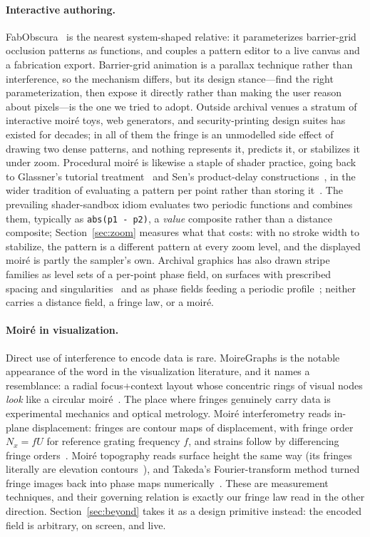 \paragraph{Interactive authoring.}
FabObscura~\cite{Sethapakdi2025FabObscura} is the nearest system-shaped relative:
it parameterizes barrier-grid occlusion patterns as functions, and couples a
pattern editor to a live canvas and a fabrication export. Barrier-grid animation
is a parallax technique rather than interference, so the mechanism differs, but its
design stance---find the right parameterization, then expose it directly rather
than making the user reason about pixels---is the one we tried to adopt. Outside
archival venues a stratum of interactive moir\'e toys, web generators, and
security-printing design suites has existed for decades; in all of them the
fringe is an unmodelled side effect of drawing two dense patterns, and nothing
represents it, predicts it, or stabilizes it under zoom. Procedural moir\'e is
likewise a staple of shader practice, going back to Glassner's tutorial
treatment~\cite{Glassner1997Inside} and Sen's product-delay
constructions~\cite{Sen1998Product, Sen2000Moire}, in the wider tradition of
evaluating a pattern per point rather than storing it~\cite{Ebert2003Texturing}.
The prevailing shader-sandbox idiom evaluates two periodic functions and
combines them, typically as \texttt{abs(p1 - p2)}, a \emph{value} composite
rather than a distance composite; Section~\ref{sec:zoom} measures what
that costs: with no stroke width to stabilize, the pattern is a different
pattern at every zoom level, and the displayed moir\'e is partly the
sampler's own. Archival graphics has also drawn stripe families as level sets
of a per-point phase field, on surfaces with prescribed spacing and
singularities~\cite{Knoppel2015Stripe} and as phase fields feeding a periodic
profile~\cite{Tricard2019Phasor}; neither carries a distance field, a fringe
law, or a moir\'e.

\paragraph{Moir\'e in visualization.}
Direct use of interference to encode data is rare. MoireGraphs is the notable
appearance of the word in the visualization literature, and it names a
resemblance: a radial focus+context layout whose concentric rings of visual nodes
\emph{look} like a circular moir\'e~\cite{JankunKelly2003Moire}. The place where
fringes genuinely carry data is experimental mechanics and optical metrology.
Moir\'e interferometry reads in-plane displacement: fringes are contour maps of
displacement, with fringe order $N_x=fU$ for reference grating frequency $f$,
and strains follow by differencing fringe orders~\cite{Post2008Moire,
Post1994High}. Moir\'e topography reads surface height the same way (its
fringes literally are elevation contours~\cite{Takasaki1970Moire,
Meadows1970Contours}), and Takeda's Fourier-transform method turned fringe
images back into phase maps numerically~\cite{Takeda1982Fourier}. These are
measurement techniques, and their governing relation is exactly our fringe law
read in the other direction. Section~\ref{sec:beyond} takes it as a design
primitive instead: the encoded field is arbitrary, on screen, and live.

